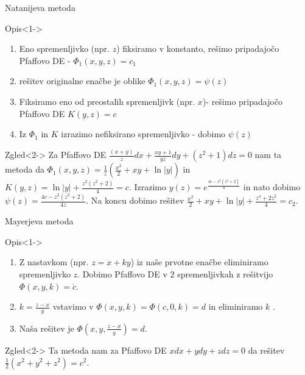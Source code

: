 \documentclass[t, 8pt]{beamer} %
\newcommand{\abs}[1]{\ensuremath{\lvert #1 \rvert}}
\newcommand{\fillblack}[1]{
	\begin{tikzpicture}[remember picture, overlay]
		\node [shift={(0 cm,0cm)}]  at (current page.south west)
		{%
			\begin{tikzpicture}[remember picture, overlay] at (current page.south west)
				\draw [fill=black] (0, 0) -- (0,#1 \paperheight) --
				(\paperwidth,#1 \paperheight) -- (\paperwidth,0) -- cycle ;
			\end{tikzpicture}
		};
		\draw (current page.north west) rectangle (current page.south east);
	\end{tikzpicture}
}
\begin{document}
		\begin{frame}{Natanijeva metoda}
			\begin{block}{Opis}<1->
				\begin{enumerate}
					\item Eno spremenljivko (npr. $z$) fiksiramo v konstanto, rešimo pripadajočo Pfaffovo DE - $\Phi_1(x, y, z) = c_1$
					\item rešitev originalne enačbe je oblike $\Phi_1(x, y, z) = \psi(z)$
					\item Fiksiramo eno od preostalih spremenljivk (npr. $x$)- rešimo pripadajočo Pfaffovo DE $K(y, z) = c$
					\item Iz $\Phi_1$ in $K$ izrazimo nefiksirano spremenljivko - dobimo $\psi(z)$
				\end{enumerate}
			\end{block}
			\begin{block}{Zgled}<2->
				Za Pfaffovo DE $\frac{(x+y)}{z}dx + \frac{xy+1}{yz}dy + (z^2 + 1)dz = 0$ nam ta metoda da $\Phi_1(x, y, z) =\frac{1}{z}(\frac{x^2}{2} + xy + \ln\abs{y})$ in $K(y, z) = \ln\abs{y} + \frac{z^2(z^2 + 2)}{4}=c$. Izrazimo $y(z) = e^{\frac{4c - z^2(z^2 + 2)}{4}}$ in nato dobimo $\psi(z) = \frac{4c - z^2(z^2 + 2)}{4z}$. Na koncu dobimo rešitev $\frac{x^2}{2} + xy + \ln\abs{y} + \frac{z^4 + 2z^2}{4} = c_2$.
			\end{block}
		\end{frame}
		
		\begin{frame}{Mayerjeva metoda}
			\begin{block}{Opis}<1->
			\begin{enumerate}
				\item Z nastavkom (npr. $z = x + ky$) iz naše prvotne enačbe eliminiramo spremenljivko $z$. Dobimo Pfaffovo DE v $2$ spremenljivkah z rešitvijo $\Phi(x, y, k) = \acute{c}$.
				\item $k = \frac{z - x}{y}$ vstavimo v $\Phi(x, y, k) = \Phi(c, 0, k) = d$ in eliminiramo $k$ .
				\item Naša rešitev je $\Phi(x, y, \frac{z - x}{y}) = d$.
			\end{enumerate}
			\end{block}
			\begin{block}{Zgled}<2->
				Ta metoda nam za Pfaffovo DE $xdx + ydy + zdz = 0$ da rešitev $\frac{1}{2}(x^2 + y^2 + z^2) = c^2$.
			\end{block}
		\end{frame}
		
\end{document}
